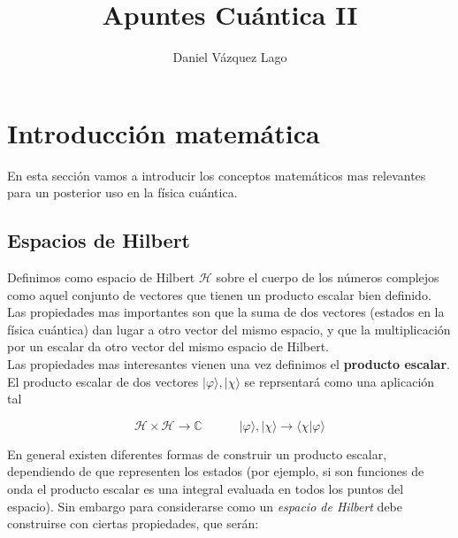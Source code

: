 \documentclass[12pt,a4paper]{book}
\title{Apuntes Cuántica II}
\author{Daniel Vázquez Lago}
\numberwithin{equation}{chapter}
\numberwithin{figure}{chapter}
\newcommand{\tquad}{\quad \quad \quad}
\begin{document}
\maketitle

\newpage

\tableofcontents

\newpage

\chapter{Introducción matemática}

En esta sección vamos a introducir los conceptos matemáticos mas relevantes para un posterior uso en la física cuántica.  \\

\section{Espacios de Hilbert}

Definimos como espacio de Hilbert $\mathcal{H}$ sobre el cuerpo de los números complejos como aquel conjunto de vectores que tienen un producto escalar bien definido. Las propiedades mas importantes son que la suma de dos vectores (estados en la física cuántica) dan lugar a otro vector del mismo espacio, y que la multiplicación por un escalar da otro vector del mismo espacio de Hilbert. \\

Las propiedades mas interesantes vienen una vez definimos el \textbf{producto escalar}. El producto escalar de dos vectores $| \varphi \rangle, | \chi \rangle$ se reprsentará como una aplicación tal

\begin{equation}
\mathcal{H} \times \mathcal{H} \rightarrow \mathbb{C} \tquad  | \varphi \rangle, | \chi \rangle  \rightarrow \langle \chi | \varphi \rangle
\end{equation}

 En general existen diferentes formas de construir un producto escalar, dependiendo de que representen los estados (por ejemplo, si son funciones de onda el producto escalar es una integral evaluada en todos los puntos del espacio). Sin embargo para considerarse como un \textit{espacio de Hilbert} debe construirse con ciertas propiedades, que serán:
\end{document}
